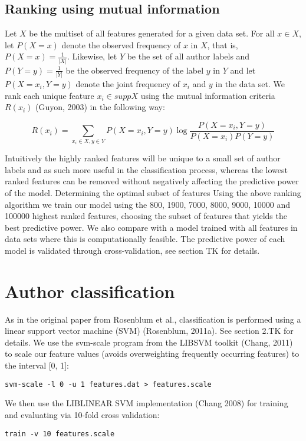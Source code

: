 \documentclass[a4paper,11pt]{kth-mag}
\begin{document}
\subsection{Ranking using mutual information}
Let $X$ be the multiset of all features generated for a given data set. For all
$x \in X$, let $P(X = x)$ denote the observed frequency of $x$ in $X$, that is,
$P(X = x) = \frac{1}{|X|}$. Likewise, let $Y$ be the set of all author labels
and $P(Y = y)= \frac{1}{|Y|}$ be the observed frequency of the label $y$ in $Y$
and let $P(X=x_i,Y=y)$ denote the joint frequency of $x_i$ and $y$ in the data
set. We rank each unique feature $x_i \in supp X $ using the mutual information
criteria $R(x_i)$ (Guyon, 2003) in the following way:

$$R(x_i)= \sum_{x_i \in X, y \in Y} P(X=x_i,Y=y) \log \frac{P(X = x_i,
Y = y)}{P(X = x_i)P(Y = y)}$$

Intuitively the highly ranked features will be unique to a small set of author
labels and as such more useful in the classification process, whereas the
lowest ranked features can be removed without negatively affecting the
predictive power of the model.  Determining the optimal subset of features
Using the above ranking algorithm we train our model using the 800, 1900, 7000,
8000, 9000, 10000 and 100000 highest ranked features, choosing the subset of
features that yields the best predictive power. We also compare with a model
trained with all features in data sets where this is computationally feasible.
The predictive power of each model is validated through cross-validation, see
section TK for details.

\section{Author classification}
As in the original paper from Rosenblum et al., classification is performed
using a linear support vector machine (SVM) (Rosenblum, 2011a). See section
2.TK for details. We use the svm-scale program from the LIBSVM toolkit (Chang,
2011) to scale our feature values (avoids overweighting frequently occurring
features) to the interval [0, 1]:
\begin{lstlisting}
svm-scale -l 0 -u 1 features.dat > features.scale
\end{lstlisting}

We then use the LIBLINEAR SVM implementation (Chang 2008) for training and
evaluating via 10-fold cross validation:
\begin{lstlisting}
train -v 10 features.scale
\end{lstlisting}
\end{document}

